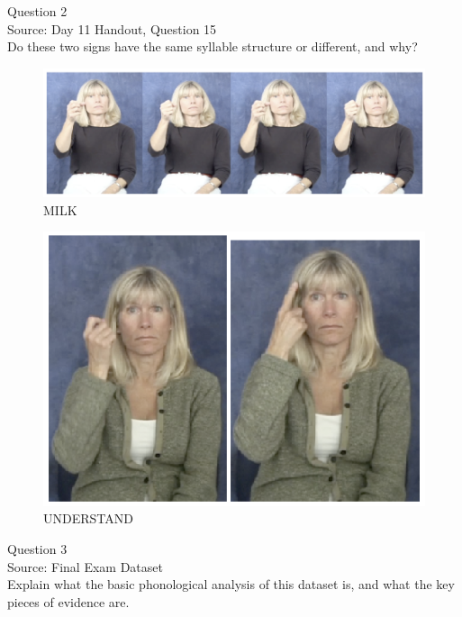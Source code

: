 \documentclass[12pt]{article}
\begin{document}
\newpage

{\large Question 2}\\

Source: Day 11 Handout, Question 15\\

Do these two signs have the same syllable structure or different, and why?\\

\begin{figure}[H]
\includegraphics{../images/asl_milk.png}
\caption{MILK}
\end{figure}
\begin{figure}[H]
\includegraphics{../images/asl_understand.png}
\caption{UNDERSTAND}
\end{figure}

\newpage

{\large Question 3}\\

Source: Final Exam Dataset\\

Explain what the basic phonological analysis of this dataset is, and what the key pieces of evidence are.\\
\end{document}
